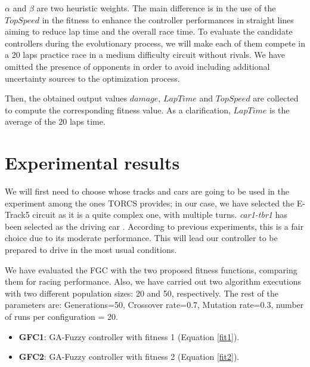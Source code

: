 \documentclass[conference]{IEEEtran}
\begin{document}
$\alpha$ and $\beta$ are two heuristic weights. The main difference is
in the use of the $TopSpeed$ in the fitness to enhance the controller performances in straight lines aiming to reduce lap time and the overall race time.
To evaluate the candidate controllers during the evolutionary process, we will make each of them compete in a 20 laps practice race in a medium difficulty circuit without rivals. We have omitted the presence of opponents in order to avoid including additional uncertainty sources to the optimization process.

Then, the obtained output values $damage$, $LapTime$ and $TopSpeed$ are collected to compute the corresponding fitness value. As a clarification, $LapTime$ is the average of the 20 laps time.



\section{Experimental results}  
\label{sec:results}


We will first need to choose whose tracks and cars are going to be used in the
experiment among the ones TORCS provides; in our case, we have selected the E-Track5 circuit as it is a
quite complex one, with multiple turns. \textit{car1-tbr1} has been
selected as the driving car \cite{evo17}. According to previous
experiments, this is a fair choice due to its moderate
performance. This will lead our controller to be prepared to drive in the most usual conditions. 

We have evaluated the FGC with the two proposed fitness functions, %
comparing them for racing performance. Also, we have  carried out two algorithm executions with two different population sizes: 20 and 50, respectively. The rest of the parameters are: Generations=50, Crossover rate=0.7, Mutation rate=0.3, number of runs per configuration = 20.

%	
\begin{itemize}
	\item \textbf{GFC1}: GA-Fuzzy controller with fitness 1 (Equation \ref{fit1}).
	\item \textbf{GFC2}: GA-Fuzzy controller with fitness 2 (Equation \ref{fit2}).
\end{itemize}
\end{document}
